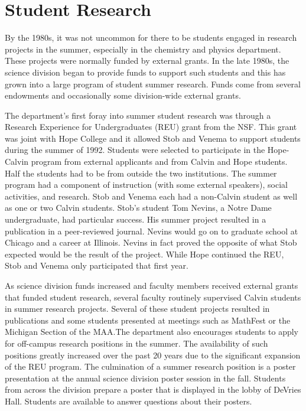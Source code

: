 \documentclass[
]{book}
\begin{document}
\hypertarget{student-research}{%
\section{Student Research}\label{student-research}}

By the 1980s, it was not uncommon for there to be students engaged in research projects in the summer, especially in the chemistry and physics department. These projects were normally funded by external grants. In the late 1980s, the science division began to provide funds to support such students and this has grown into a large program of student summer research. Funds come from several endowments and occasionally some division-wide external grants.

The department's first foray into summer student research was through a Research Experience for Undergraduates (REU) grant from the NSF. This grant was joint with Hope College and it allowed Stob and Venema to support students during the summer of 1992. Students were selected to participate in the Hope-Calvin program from external applicants and from Calvin and Hope students. Half the students had to be from outside the two institutions. The summer program had a component of instruction (with some external speakers), social activities, and research. Stob and Venema each had a non-Calvin student as well as one or two Calvin students. Stob's student Tom Nevins, a Notre Dame undergraduate, had particular success. His summer project resulted in a publication in a peer-reviewed journal. Nevins would go on to graduate school at Chicago and a career at Illinois. Nevins in fact proved the opposite of what Stob expected would be the result of the project. While Hope continued the REU, Stob and Venema only participated that first year.

As science division funds increased and faculty members received external grants that funded student research, several faculty routinely supervised Calvin students in summer research projects. Several of these student projects resulted in publications and some students presented at meetings such as MathFest or the Michigan Section of the MAA.The department also encourages students to apply for off-campus research positions in the summer. The availability of such positions greatly increased over the past 20 years due to the significant expansion of the REU program. The culmination of a summer research position is a poster presentation at the annual science division poster session in the fall. Students from across the division prepare a poster that is displayed in the lobby of DeVries Hall. Students are available to answer questions about their posters.
\end{document}
